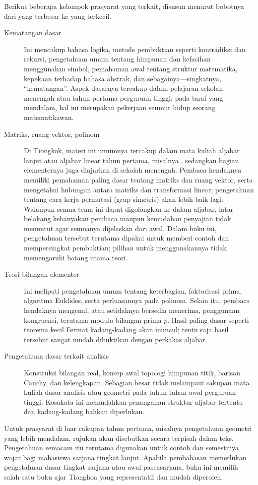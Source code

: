 Berikut beberapa kelompok prasyarat yang terkait, disusun menurut bobotnya dari yang terbesar ke yang terkecil.
\begin{description}
	\item[Kematangan dasar] Ini mencakup bahasa logika, metode pembuktian seperti kontradiksi dan rekursi, pengetahuan umum tentang himpunan dan kefasihan menggunakan simbol, pemahaman awal tentang struktur matematika, kepekaan terhadap bahasa abstrak, dan sebagainya—singkatnya, ``kematangan''. Aspek dasarnya tercakup dalam pelajaran sekolah menengah atau tahun pertama perguruan tinggi; pada taraf yang mendalam, hal ini merupakan pekerjaan seumur hidup seorang matematikawan.
	\item[Matriks, ruang vektor, polinom] Di Tiongkok, materi ini umumnya tercakup dalam mata kuliah aljabar lanjut atau aljabar linear tahun pertama, misalnya \cite{Xi16, Xi18}, sedangkan bagian elementernya juga diajarkan di sekolah menengah. Pembaca hendaknya memiliki pemahaman paling dasar tentang matriks dan ruang vektor, serta mengetahui hubungan antara matriks dan transformasi linear; pengetahuan tentang cara kerja permutasi (grup simetris) akan lebih baik lagi. Walaupun semua tema ini dapat digolongkan ke dalam aljabar, latar belakang kebanyakan pembaca maupun kemudahan penyajian tidak menuntut agar semuanya dijelaskan dari awal. Dalam buku ini, pengetahuan tersebut terutama dipakai untuk memberi contoh dan mempersingkat pembuktian; pilihan untuk menggunakannya tidak memengaruhi batang utama teori.
	\item[Teori bilangan elementer] Ini meliputi pengetahuan umum tentang keterbagian, faktorisasi prima, algoritma Euklides, serta perluasannya pada polinom. Selain itu, pembaca hendaknya mengenal, atau setidaknya bersedia menerima, penggunaan kongruensi, terutama modulo bilangan prima $p$. Hasil paling dasar seperti teorema kecil Fermat kadang-kadang akan muncul; tentu saja hasil tersebut sangat mudah dibuktikan dengan perkakas aljabar.
	\item[Pengetahuan dasar terkait analisis] Konstruksi bilangan real, konsep awal topologi himpunan titik, barisan Cauchy, dan kelengkapan. Sebagian besar tidak melampaui cakupan mata kuliah dasar analisis atau geometri pada tahun-tahun awal perguruan tinggi. Kosakata ini memudahkan penanganan struktur aljabar tertentu dan kadang-kadang bahkan diperlukan.
\end{description}
Untuk prasyarat di luar cakupan tahun pertama, misalnya pengetahuan geometri yang lebih mendalam, rujukan akan disebutkan secara terpisah dalam teks. Pengetahuan semacam itu terutama digunakan untuk contoh dan semestinya wajar bagi mahasiswa sarjana tingkat lanjut. Apabila pembahasan memerlukan pengetahuan dasar tingkat sarjana atau awal pascasarjana, buku ini memilih salah satu buku ajar Tionghoa yang representatif dan mudah diperoleh.


